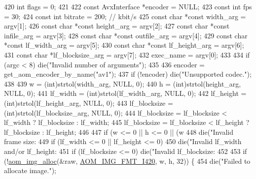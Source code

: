 \begin{DoxyCodeInclude}
{{{{{{{{{{420   \textcolor{keywordtype}{int} flags = 0;
421 
422   \textcolor{keyword}{const} AvxInterface *encoder = NULL;
423   \textcolor{keyword}{const} \textcolor{keywordtype}{int} fps = 30;
424   \textcolor{keyword}{const} \textcolor{keywordtype}{int} bitrate = 200;  \textcolor{comment}{// kbit/s}
425   \textcolor{keyword}{const} \textcolor{keywordtype}{char} *\textcolor{keyword}{const} width\_arg = argv[1];
426   \textcolor{keyword}{const} \textcolor{keywordtype}{char} *\textcolor{keyword}{const} height\_arg = argv[2];
427   \textcolor{keyword}{const} \textcolor{keywordtype}{char} *\textcolor{keyword}{const} infile\_arg = argv[3];
428   \textcolor{keyword}{const} \textcolor{keywordtype}{char} *\textcolor{keyword}{const} outfile\_arg = argv[4];
429   \textcolor{keyword}{const} \textcolor{keywordtype}{char} *\textcolor{keyword}{const} lf\_width\_arg = argv[5];
430   \textcolor{keyword}{const} \textcolor{keywordtype}{char} *\textcolor{keyword}{const} lf\_height\_arg = argv[6];
431   \textcolor{keyword}{const} \textcolor{keywordtype}{char} *lf\_blocksize\_arg = argv[7];
432   exec\_name = argv[0];
433 
434   \textcolor{keywordflow}{if} (argc < 8) die(\textcolor{stringliteral}{"Invalid number of arguments"});
435 
436   encoder = get\_aom\_encoder\_by\_name(\textcolor{stringliteral}{"av1"});
437   \textcolor{keywordflow}{if} (!encoder) die(\textcolor{stringliteral}{"Unsupported codec."});
438 
439   w = (int)strtol(width\_arg, NULL, 0);
440   h = (int)strtol(height\_arg, NULL, 0);
441   lf\_width = (int)strtol(lf\_width\_arg, NULL, 0);
442   lf\_height = (int)strtol(lf\_height\_arg, NULL, 0);
443   lf\_blocksize = (int)strtol(lf\_blocksize\_arg, NULL, 0);
444   lf\_blocksize = lf\_blocksize < lf\_width ? lf\_blocksize : lf\_width;
445   lf\_blocksize = lf\_blocksize < lf\_height ? lf\_blocksize : lf\_height;
446 
447   \textcolor{keywordflow}{if} (w <= 0 || h <= 0 || (w %
448     die(\textcolor{stringliteral}{"Invalid frame size: %
449   \textcolor{keywordflow}{if} (lf\_width <= 0 || lf\_height <= 0)
450     die(\textcolor{stringliteral}{"Invalid lf\_width and/or lf\_height: %
451   \textcolor{keywordflow}{if} (lf\_blocksize <= 0) die(\textcolor{stringliteral}{"Invalid lf\_blocksize: %
452 
453   \textcolor{keywordflow}{if} (!\hyperlink{aom__image_8h_a570db29fbd122951235a08fe9375f6bb}{aom\_img\_alloc}(&raw, \hyperlink{aom__image_8h_a930317c04b4bd0a660bb5e744055523cabd778a3d697463e89d12a1117f417b60}{AOM\_IMG\_FMT\_I420}, w, h, 32)) \{
454     die(\textcolor{stringliteral}{"Failed to allocate image."});
}}}}}}}}}}}}}
\end{DoxyCodeInclude}
